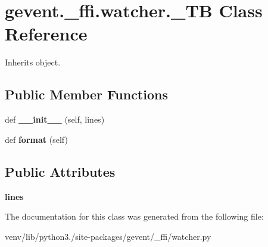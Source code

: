 \hypertarget{classgevent_1_1__ffi_1_1watcher_1_1___t_b}{}\section{gevent.\+\_\+ffi.\+watcher.\+\_\+\+TB Class Reference}
\label{classgevent_1_1__ffi_1_1watcher_1_1___t_b}


Inherits object.

\subsection*{Public Member Functions}
\begin{DoxyCompactItemize}
\item 
\mbox{\label{classgevent_1_1__ffi_1_1watcher_1_1___t_b_a2bed9852c4f2c2e41c959df39ddbdd83}} 
def {\bfseries \+\_\+\+\_\+init\+\_\+\+\_\+} (self, lines)
\item 
\mbox{\label{classgevent_1_1__ffi_1_1watcher_1_1___t_b_a87dc4a0245682484a99742b243ec9aa2}} 
def {\bfseries format} (self)
\end{DoxyCompactItemize}
\subsection*{Public Attributes}
\begin{DoxyCompactItemize}
\item 
\mbox{\label{classgevent_1_1__ffi_1_1watcher_1_1___t_b_aa2124f24c7872effca6e62db26420879}} 
{\bfseries lines}
\end{DoxyCompactItemize}


The documentation for this class was generated from the following file\+:\begin{DoxyCompactItemize}
\item 
venv/lib/python3./site-\/packages/gevent/\+\_\+ffi/watcher.\+py\end{DoxyCompactItemize}
